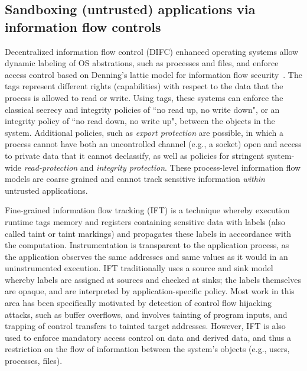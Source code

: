 \subsection{Sandboxing (untrusted) applications via information flow controls}

Decentralized information flow control (DIFC) enhanced operating systems allow
dynamic labeling of OS abstrations, such as processes and files, and enforce
access control based on Denning's lattic model for information flow
security~\cite{}.
%
The tags represent different rights (capabilities) with respect to the data
that the process is allowed to read or write.
%
Using tags, these systems can enforce the classical secrecy and integrity policies of
``no read up, no write down", or an integrity policy of ``no read down, no
write up", between the objects in the system.
%
Additional policies, such as \emph{export protection} are possible, in which a
process cannot have both an uncontrolled channel (e.g., a socket) open and
access to private data that it cannot declassify, as well as
policies for stringent system-wide \emph{read-protection} and \emph{integrity
protection}.
%
These process-level information flow models are coarse grained and cannot track
sensitive information \emph{within} untrusted applications.


%
Fine-grained information flow tracking (IFT) is a technique whereby execution
runtime tags memory and registers containing sensitive data with labels (also
called taint or taint markings) and propagates these labels in
acccordance with the computation.
%
Instrumentation is transparent to the application process, as the application
observes the same addresses and same values as it would in an uninstrumented
execution.
%
IFT traditionally uses a source and sink model whereby labels are
assigned at sources and checked at sinks; the labels themselves are opaque,
and are interpreted by application-specific policy.
%
Most work in this area has been specifically motivated by detection of control
flow hijacking attacks, such as buffer overflows, and involves tainting of
program inputs, and trapping of control transfers to tainted target addresses.
%
However, IFT is also used to enforce mandatory access control on data and
derived data, and thus a restriction on the flow of information between
the system's objects (e.g., users, processes, files).


